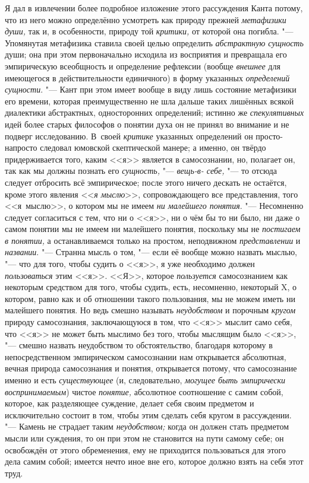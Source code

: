 Я дал в извлечении более подробное изложение этого рассуждения
Канта потому, что из него можно определённо усмотреть как природу прежней
{\em метафизики души,}
так и, в особенности, природу той
{\em критики,} от которой
она погибла. "--- Упомянутая метафизика ставила своей целью
определить {\em абстрактную сущность}
души; она при этом первоначально исходила из восприятия и
превращала его эмпирическую всеобщность и определение рефлексии (вообще
{\em внешнее} для
имеющегося в действительности единичного) в форму указанных
{\em определений сущности}. "---
Кант при этом имеет вообще в виду лишь состояние метафизики
его времени, которая преимущественно не шла дальше таких лишённых всякой
диалектики абстрактных, односторонних определений; истинно же
{\em спекулятивных} идей
более старых философов о понятии духа он не принял во внимание и не подверг
исследованию. В~своей {\em критике}
указанных определений он просто-напросто следовал юмовской
скептической манере; а именно, он твёрдо придерживается того, каким <<я>>
является в самосознании, но, полагает он, так как мы должны познать его
{\em сущность,} "---
{\em вещь-в- себе,} "--- то
отсюда следует отбросить всё эмпирическое; после этого ничего дескать не
остаётся, кроме этого явления
<<{\em я мыслю}>>,
сопровождающего все представления, того <<я~мыслю>>, о котором
мы не имеем {\em ни малейшего понятия}.
"--- Несомненно следует согласиться с тем, что ни о <<я>>, ни о
чём бы то ни было, ни даже о самом понятии мы не имеем ни малейшего
понятия, поскольку мы не {\em постигаем
в понятии,} а останавливаемся только на простом, неподвижном
{\em представлении} и
{\em названии}. "--- Странна
мысль о том, "--- если её вообще можно назвать мыслью, "---
что для того, чтобы судить о <<я>>, я уже необходимо должен
{\em пользоваться} этим
<<я>>. <<Я>>, которое {\em пользуется}
самосознанием как некоторым средством для того, чтобы судить,
есть, несомненно, некоторый X, о котором, равно как и об отношении такого
пользования, мы не можем иметь ни малейшего понятия. Но ведь смешно
называть {\em неудобством}
и порочным
{\em кругом}
природу самосознания, заключающуюся в том, что <<я>> мыслит
само себя, что <<я>> не может быть мыслимо без того, чтобы мыслящим было
<<я>>, "--- смешно назвать неудобством то обстоятельство,
благодаря которому в непосредственном эмпирическом
самосознании нам открывается абсолютная, вечная природа самосознания и
понятия, открывается потому, что самосознание именно и есть
{\em существующее} (и,
следовательно, {\em могущее быть
эмпирически воспринимаемым}) чистое
{\em понятие,} абсолютное
соотношение с самим собой, которое, как разделяющее суждение, делает себя
своим предметом и исключительно состоит в том, чтобы этим сделать себя
кругом в рассуждении. "--- Камень не страдает таким
{\em неудобством;} когда
он должен стать предметом мысли или суждения, то он при этом не становится
на пути самому себе; он освобождён от этого обременения, ему не приходится
пользоваться для этого дела самим собой; имеется нечто иное вне его,
которое должно взять на себя этот труд.

